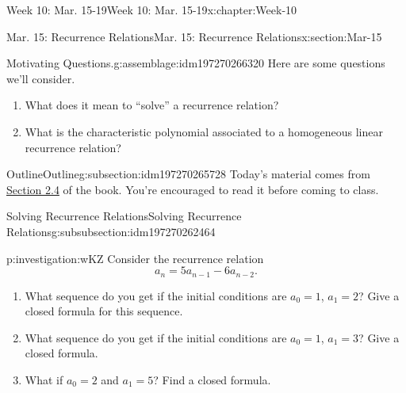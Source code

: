 \documentclass[oneside,10pt,]{book}
\numberwithin{equation}{section}
\begin{document}
\begin{chapterptx}{Week 10: Mar. 15-19}{}{Week 10: Mar. 15-19}{}{}{x:chapter:Week-10}
%
%
\typeout{************************************************}
\typeout{************************************************}
%
\begin{sectionptx}{Mar. 15: Recurrence Relations}{}{Mar. 15: Recurrence Relations}{}{}{x:section:Mar-15}
\begin{introduction}{}%
\begin{assemblage}{Motivating Questions.}{g:assemblage:idm197270266320}%
Here are some questions we'll consider. %
\begin{enumerate}
\item{}What does it mean to ``solve'' a recurrence relation?%
\item{}What is the characteristic polynomial associated to a homogeneous linear recurrence relation?%
\end{enumerate}
%
\end{assemblage}
\end{introduction}%
%
%
\typeout{************************************************}
\typeout{************************************************}
%
\begin{subsectionptx}{Outline}{}{Outline}{}{}{g:subsection:idm197270265728}
Today's material comes from \href{http://discrete.openmathbooks.org/dmoi3/sec_recurrence.html}{Section 2.4} of the book. You're encouraged to read it before coming to class.%
%
%
\typeout{************************************************}
\typeout{************************************************}
%
\begin{subsubsectionptx}{Solving Recurrence Relations}{}{Solving Recurrence Relations}{}{}{g:subsubsection:idm197270262464}
\begin{investigation}{}{p:investigation:wKZ}%
Consider the recurrence relation%
\begin{equation*}
a_n = 5a_{n-1} - 6a_{n-2}\text{.}
\end{equation*}
%
\begin{enumerate}
\item{}What sequence do you get if the initial conditions are \(a_0 = 1\), \(a_1 = 2\)? Give a closed formula for this sequence.%
\item{}What sequence do you get if the initial conditions are \(a_0 = 1\), \(a_1 = 3\)? Give a closed formula.%
\item{}What if \(a_0 = 2\) and \(a_1 = 5\)? Find a closed formula.%

\end{enumerate}
\end{investigation}
\end{subsubsectionptx}
\end{subsectionptx}
\end{sectionptx}
\end{chapterptx}
\end{document}
